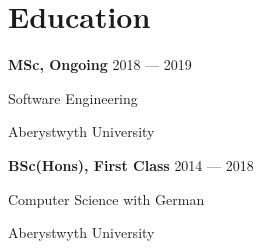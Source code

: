 \section{Education}

\parbox[t][][t]{\linewidth}{
	\parbox{\linewidth}{\textbf{MSc, Ongoing} \hfill {{2018 --- 2019}}}
	\parbox{\linewidth}{{Software Engineering}}
	\parbox{\linewidth}{{Aberystwyth University}}
	\smallskip
}

\parbox[t][][t]{\linewidth}{
	\parbox{\linewidth}{\textbf{BSc(Hons), First Class} \hfill {{2014 --- 2018}}}
	\parbox{\linewidth}{{Computer Science with German}}
	\parbox{\linewidth}{{Aberystwyth University}}
	\smallskip
}

